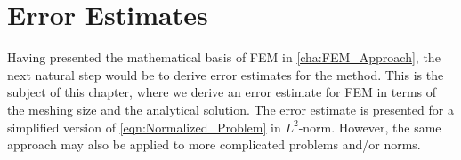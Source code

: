 \chapter{Error Estimates} \label{cha:Error_Estimates}
Having presented the mathematical basis of FEM in \cref{cha:FEM_Approach}, the next natural step would be to derive error
estimates for the method. This is the subject of this chapter, where we derive an error estimate for FEM in terms of the meshing
size and the analytical solution. The error estimate is presented for a simplified version of \cref{eqn:Normalized_Problem} in
$L^2$-norm. However, the same approach may also be applied to more complicated problems and/or norms. 
%




%
